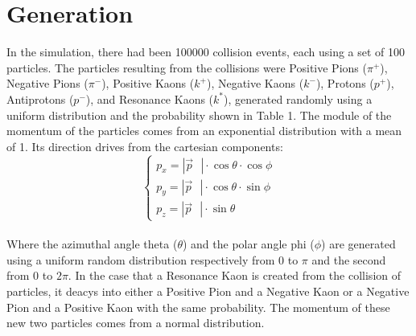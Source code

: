 \documentclass[a4paper, 11pt]{article}
\begin{document}
    \section{Generation}
      In the simulation, there had been 100000 collision events, each using a set of 100 particles. The particles resulting from the collisions were Positive Pions ($\pi^+$), Negative Pions ($\pi^-$), Positive Kaons ($k^+$), Negative Kaons ($k^-$), Protons ($p^+$), Antiprotons ($p^-$), and Resonance Kaons ($k^*$), generated randomly using a uniform distribution and the probability shown in Table 1.  The module of the momentum of the particles comes from an exponential distribution with a mean of 1. Its direction drives from the cartesian components:
      \begin{equation}
        \begin{cases}
          p_x = |\vec{p} \mbox{ } | \cdot \cos \theta \cdot \cos \phi\\
          p_y = |\vec{p} \mbox{ } | \cdot \cos \theta \cdot \sin \phi\\
          p_z = |\vec{p} \mbox{ } | \cdot \sin \theta
        \end{cases}
      \end{equation}\\
      Where the azimuthal angle theta ($\theta$) and the polar angle phi ($\phi$) are generated using a uniform random distribution respectively from 0 to $\pi$ and the second from 0 to $2\pi$.
      In the case that a Resonance Kaon is created from the collision of particles, it deacys into either a Positive Pion and a Negative Kaon or a Negative Pion and a Positive Kaon with the same probability. The momentum of these new two particles comes from a normal distribution.
\end{document}

